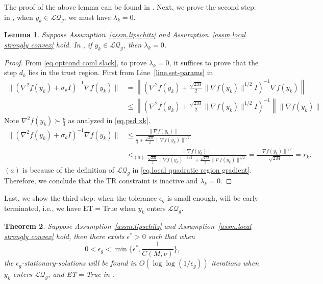 \documentclass{article}
\newtheorem{theorem}{Theorem}[section]
\newtheorem{lemma}[theorem]{Lemma}
\numberwithin{equation}{section}
\numberwithin{equation}{section}
\begin{document}
The proof of the above lemma can be found in .
Next, we prove the second step: in , when $y_k\in\mathcal{LQ}_g$, we must have $\lambda_k=0$.
\begin{lemma}
    \label{lem.detection of local quadratic}
    Suppose Assumption~\ref{assm.lipschitz} and Assumption~\ref{assm.local strongly convex} hold. In , if $y_k\in\mathcal{LQ}_g$, then $\lambda_k=0$.
\end{lemma}
\begin{proof}
    From \eqref{eq.optcond coml slack}, to prove $\lambda_k=0$, it suffices to prove that the step $d_k$ lies in the trust region. First from Line~\ref{line.set-params} in 
    \begin{equation*}
        \begin{aligned}
            \|(\nabla^2 f(y_k)+\sigma_k I)^{-1}\nabla f(y_k)\| & = \left\|\left (\nabla^2 f(y_k)+\frac{\sqrt{2M}}{2} \|\nabla f(y_k)\|^{1/2} I\right)^{-1}\nabla f(y_k)\right\|         \\
                                                               & \leq \left\|\left (\nabla^2 f(y_k)+\frac{\sqrt{2M}}{2} \|\nabla f(y_k)\|^{1/2} I\right)^{-1}\right\| \|\nabla f(y_k)\|
        \end{aligned}
    \end{equation*}
    Note $\nabla^2 f(y_k)\succ \frac{\nu}{3}$ as analyzed in \eqref{eq.psd xk}.
    \begin{equation*}
        \begin{aligned}
            \|(\nabla^2 f(y_k)+\sigma_k I)^{-1}\nabla f(y_k)\| & \leq \frac{\|\nabla f(y_k)\|}{\frac{\nu}{3}+\frac{\sqrt{2M}}{2} \|\nabla f(y_k)\|^{1/2}} \\&<_{(a)} \frac{\|\nabla f(y_k)\|}{\frac{\sqrt{2M}}{2}\|\nabla f(y_k)\|^{1/2}+\frac{\sqrt{2M}}{2} \|\nabla f(y_k)\|^{1/2}} =\frac{\|\nabla f(y_k)\|^{1/2}}{\sqrt{2M}} =r_k.
        \end{aligned}
    \end{equation*}
    $(a)$ is because of the definition of $\mathcal{LQ}_g$ in \eqref{eq.local quadratic region gradient}. Therefore, we conclude that the TR constraint is inactive and $\lambda_k=0$.
\end{proof}
Last, we show the third step: when the tolerance $\epsilon_g$ is small enough,  will be early terminated, i.e., we have ET$=$True when $y_k$ enters $\mathcal{LQ}_g$.
\begin{theorem}
    \label{thm.local quadratic convergence}
    Suppose Assumption~\ref{assm.lipschitz} and Assumption~\ref{assm.local strongly convex} hold, then there exists $\epsilon^* >0$ such that when
    \begin{equation}
        \label{eq.regularity epsilon}
        0<\epsilon_g< \min\{\epsilon^*, \frac{1}{C(M,\nu)}\},
    \end{equation}
    the $\epsilon_g$-stationary-solutions will be found in $O\left(\log\log\left(1/\epsilon_g\right)\right)$ iterations when $y_k$ enters $\mathcal{LQ}_g$, and ET$=$True in .
\end{theorem}
\end{document}
